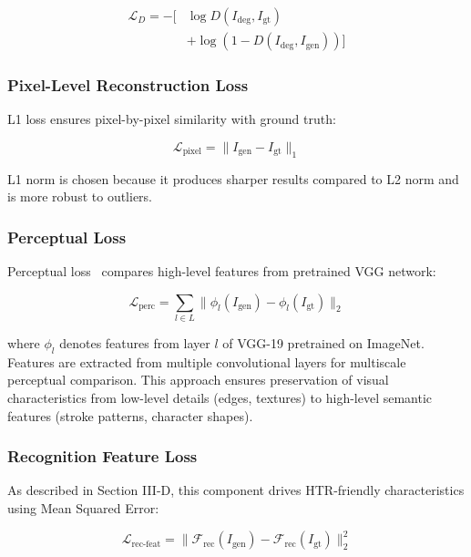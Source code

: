 \documentclass[journal]{IEEEtran}
\begin{document}
\begin{equation}
\begin{split}
\mathcal{L}_D = -[&\log D(I_{\text{deg}}, I_{\text{gt}}) \\
&+ \log(1 - D(I_{\text{deg}}, I_{\text{gen}}))]
\end{split}
\end{equation}

\subsubsection{Pixel-Level Reconstruction Loss}

L1 loss ensures pixel-by-pixel similarity with ground truth:

\begin{equation}
\mathcal{L}_{\text{pixel}} = \|I_{\text{gen}} - I_{\text{gt}}\|_1
\end{equation}

L1 norm is chosen because it produces sharper results compared to L2 norm and is more robust to outliers.

\subsubsection{Perceptual Loss}

Perceptual loss~\cite{johnson2016perceptual} compares high-level features from pretrained VGG network:

\begin{equation}
\mathcal{L}_{\text{perc}} = \sum_{l \in L} \|\phi_l(I_{\text{gen}}) - \phi_l(I_{\text{gt}})\|_2
\end{equation}

where $\phi_l$ denotes features from layer $l$ of VGG-19 pretrained on ImageNet. Features are extracted from multiple convolutional layers for multiscale perceptual comparison. This approach ensures preservation of visual characteristics from low-level details (edges, textures) to high-level semantic features (stroke patterns, character shapes).

\subsubsection{Recognition Feature Loss}

As described in Section III-D, this component drives HTR-friendly characteristics using Mean Squared Error:

\begin{equation}
\mathcal{L}_{\text{rec-feat}} = \|\mathcal{F}_{\text{rec}}(I_{\text{gen}}) - \mathcal{F}_{\text{rec}}(I_{\text{gt}})\|_2^2
\end{equation}
\end{document}
